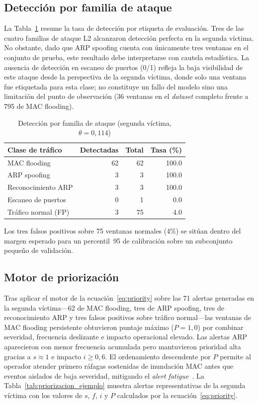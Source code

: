 \documentclass[conference]{IEEEtran}
\newcommand{\trafonormal}{tráfico normal}
\newcommand{\arpspoof}{ARP spoofing}
\newcommand{\macflood}{MAC flooding}
\newcommand{\portscan}{escaneo de puertos}
\newcommand{\arprecon}{reconocimiento ARP}
\newcommand{\victimados}{segunda víctima}
\begin{document}
\subsection{Detección por familia de ataque}
La Tabla~\ref{tab:deteccion_clase} resume la tasa de detección por
etiqueta de evaluación. Tres de las cuatro familias de ataque L2
alcanzaron detección perfecta en la \victimados. No obstante, dado
que \arpspoof{} cuenta con únicamente tres ventanas en el
conjunto de prueba, este resultado debe interpretarse con cautela
estadística. La ausencia de detección en \portscan{} (0/1)
refleja la baja visibilidad de este ataque desde la perspectiva de la
\victimados, donde solo una ventana fue etiquetada para esta
clase; no constituye un fallo del modelo sino una limitación del punto
de observación (36 ventanas en el \textit{dataset} completo frente a
795 de \macflood).

\begin{table}[htbp]
\caption{Detección por familia de ataque (segunda víctima, $\theta=0{,}114$)}
\label{tab:deteccion_clase}
\centering
\renewcommand{\arraystretch}{1.15}
\begin{tabular}{lrrr}
\hline
\textbf{Clase de tráfico} & \textbf{Detectadas} & \textbf{Total} & \textbf{Tasa (\%)} \\
\hline
MAC flooding  & 62 & 62 & 100.0 \\
ARP spoofing  &  3 &  3 & 100.0 \\
Reconocimiento ARP  &  3 &  3 & 100.0 \\
Escaneo de puertos  &  0 &  1 &   0.0 \\
Tráfico normal (FP) &  3 & 75 &   4.0 \\
\hline
\end{tabular}
\end{table}

Los tres falsos positivos sobre 75 ventanas normales (4\%) se sitúan
dentro del margen esperado para un percentil~95 de calibración sobre un
subconjunto pequeño de validación.

\subsection{Motor de priorización}
Tras aplicar el motor de la ecuación~\eqref{eq:priority} sobre las 71
alertas generadas en la \victimados---62 de \macflood, tres de
\arpspoof, tres de \arprecon{} y tres falsos positivos
sobre \trafonormal---las ventanas de \macflood{}
persistente obtuvieron puntaje máximo ($P=1{,}0$) por
combinar severidad, frecuencia deslizante e impacto operacional elevado.
Las alertas ARP aparecieron con menor frecuencia acumulada pero mantuvieron
prioridad alta gracias a $s \approx 1$ e impacto $i \geq 0{,}6$. El
ordenamiento descendente por $P$ permite al operador atender primero
ráfagas sostenidas de inundación MAC antes que eventos aislados de baja
severidad, mitigando el \textit{alert fatigue}~\cite{tariq2025}.
La Tabla~\ref{tab:priorizacion_ejemplo} muestra alertas representativas
de la \victimados{} con los valores de $s$, $f$, $i$ y $P$ calculados
por la ecuación~\eqref{eq:priority}.
\end{document}
